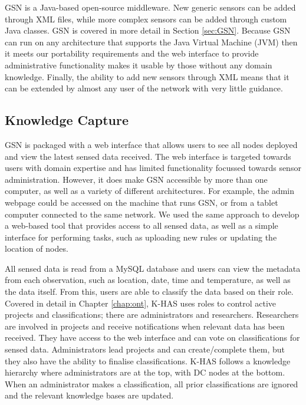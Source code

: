 	GSN is a Java-based open-source middleware. New generic sensors can be added through XML files, while more complex sensors can be added through custom Java classes. GSN is covered in more detail in Section \ref{sec:GSN}. Because GSN can run on any architecture that supports the Java Virtual Machine (JVM) then it meets our portability requirements and the web interface to provide administrative functionality makes it usable by those without any domain knowledge. Finally, the ability to add new sensors through XML means that it can be extended by almost any user of the network with very little guidance.
		
	\subsection{Knowledge Capture}\label{arch:kc}
		GSN is packaged with a web interface that allows users to see all nodes deployed and view the latest sensed data received. The web interface is targeted towards users with domain expertise and has limited functionality focussed towards sensor administration. However, it does make GSN accessible by more than one computer, as well as a variety of different architectures. For example, the admin webpage could be accessed on the machine that runs GSN, or from a tablet computer connected to the same network. We used the same approach to develop a web-based tool that provides access to all sensed data, as well as a simple interface for performing tasks, such as uploading new rules or updating the location of nodes.
		
		All sensed data is read from a MySQL database and users can view the metadata from each observation, such as location, date, time and temperature, as well as the data itself. From this, users are able to classify the data based on their role. Covered in detail in Chapter \ref{chap:ont}, K-HAS uses roles to control active projects and classifications; there are administrators and researchers. Researchers are involved in projects and receive notifications when relevant data has been received. They have access to the web interface and can vote on classifications for sensed data. Administrators lead projects and can create/complete them, but they also have the ability to finalise classifications. K-HAS follows a knowledge hierarchy where administrators are at the top, with DC nodes at the bottom. When an administrator makes a classification, all prior classifications are ignored and the relevant knowledge bases are updated.
		
